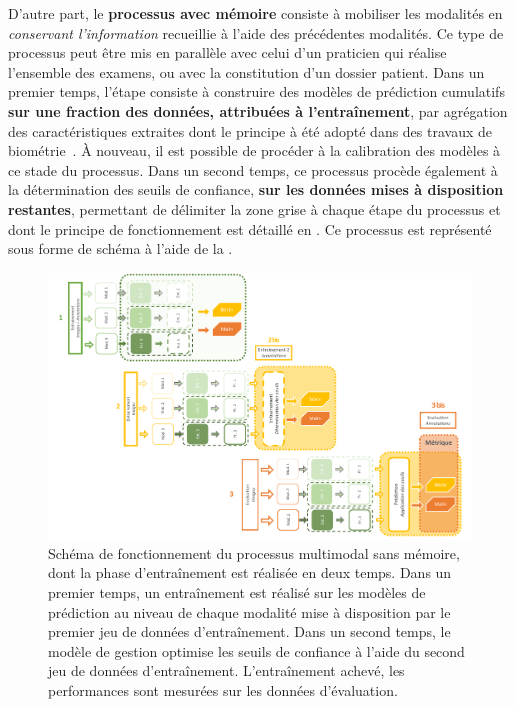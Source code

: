 D'autre part, le \textbf{processus avec mémoire} consiste à mobiliser les modalités en \textit{conservant l'information} recueillie à l'aide des précédentes modalités. Ce type de processus peut être mis en parallèle avec celui d'un praticien qui réalise l'ensemble des examens, ou avec la constitution d'un dossier patient. Dans un premier temps, l'étape consiste à construire des modèles de prédiction cumulatifs \textbf{sur une fraction des données, attribuées à l'entraînement}, par agrégation des caractéristiques extraites dont le principe à été adopté dans des travaux de biométrie~\cite{Krishneswari2012}. À nouveau, il est possible de procéder à la calibration des modèles à ce stade du processus. Dans un second temps, ce processus procède également à la détermination des seuils de confiance, \textbf{sur les données mises à disposition restantes}, permettant de délimiter la zone grise à chaque étape du processus et dont le principe de fonctionnement est détaillé en . Ce processus est représenté sous forme de schéma à l'aide de la .\par

\begin{landscape}
\begin{figure}[H]
    \centering
    \includegraphics[width=0.85\linewidth]{contents/chapter_8/resources/scheme_multimodal_process_without.pdf}
    \caption{Schéma de fonctionnement du processus multimodal sans mémoire, dont la phase d'entraînement est réalisée en deux temps. Dans un premier temps, un entraînement est réalisé sur les modèles de prédiction au niveau de chaque modalité mise à disposition par le premier jeu de données d'entraînement. Dans un second temps, le modèle de gestion optimise les seuils de confiance à l'aide du second jeu de données d'entraînement. L'entraînement achevé, les performances sont mesurées sur les données d'évaluation.}
    \label{fig:scheme_multimodal_process_without}
\end{figure}\par
\end{landscape}

